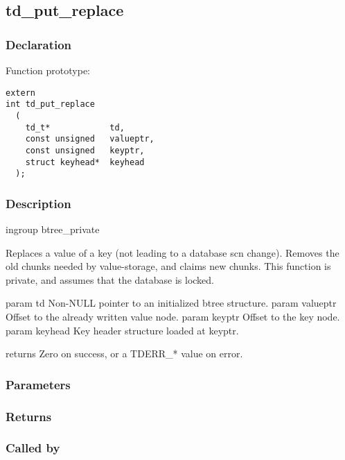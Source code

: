 
\newpage
\subsection{td\_put\_replace}
\subsubsection{Declaration} Function prototype:

\begin{verbatim}
extern
int td_put_replace
  (
    td_t*            td,
    const unsigned   valueptr,
    const unsigned   keyptr,
    struct keyhead*  keyhead
  );
\end{verbatim}

\subsubsection{Description}

 
 ingroup btree\_private

 Replaces a value of a key (not leading to a database scn change).
 Removes the old chunks needed by value-storage, and claims new chunks.
 This function is private, and assumes that the database is locked.

 param td Non-NULL pointer to an initialized btree structure.
 param valueptr Offset to the already written value node.
 param keyptr Offset to the key node.
 param keyhead Key header structure loaded at keyptr.

 returns Zero on success, or a TDERR\_* value on error.
 

\subsubsection{Parameters}
\subsubsection{Returns}
\subsubsection{Called by}
